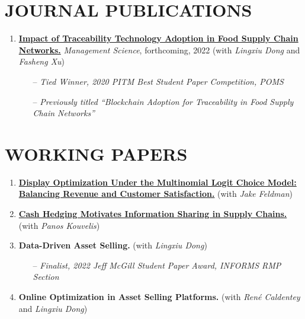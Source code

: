\documentclass[margin]{res} %
\begin{document}
\begin{resume}
\section{JOURNAL PUBLICATIONS}
\begin{enumerate}[leftmargin=*]
    \item %
        \href{https://pubsonline.informs.org/doi/abs/10.1287/mnsc.2022.4440?casa_token=br5-nMm53OIAAAAA:nQxcEPswA7DUJZgJ1CZsL0DModEzd-a-1Y5zOh68ebSQo1LU177cocuRpaC3BXYQcoELLTilwzPY}{\textbf{Impact of Traceability Technology Adoption in Food Supply Chain Networks.}} {\it Management Science}, forthcoming, 2022 (with {\it Lingxiu Dong} and {\it Fasheng Xu})
        \begin{itemize}
            \item[--] {\it Tied Winner, 2020 PITM Best Student Paper Competition, POMS}
            \item[--] {\it Previously titled ``Blockchain Adoption for Traceability in Food Supply Chain Networks''}
        \end{itemize}
\end{enumerate}


    \section{WORKING PAPERS}
    \begin{enumerate}[resume,leftmargin=*]
        \item \href{https://papers.ssrn.com/sol3/papers.cfm?abstract_id=3909033}{\textbf{Display Optimization Under the Multinomial Logit Choice Model: Balancing Revenue and Customer Satisfaction.}} (with {\it Jake Feldman})
        \item \href{https://papers.ssrn.com/sol3/papers.cfm?abstract_id=3936170}{\textbf{Cash Hedging Motivates Information Sharing in Supply Chains.}} (with {\it Panos Kouvelis})
        \item \textbf{Data-Driven Asset Selling.} (with {\it Lingxiu Dong})
            \begin{itemize}
                \item[--] {\it Finalist, 2022 Jeff McGill Student Paper Award, INFORMS RMP Section}
            \end{itemize}
        \item \textbf{Online Optimization in Asset Selling Platforms.} (with {\it Ren\'{e} Caldentey} and {\it Lingxiu Dong})
    \end{enumerate}



\end{resume}
\end{document}
